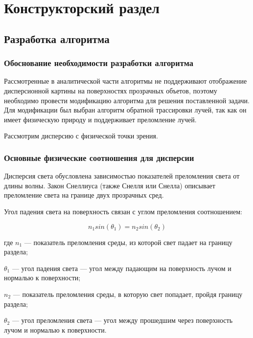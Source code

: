 \chapter{Конструкторский раздел}
\label{cha:design}

  \section{Разработка алгоритма}
  
    \subsection{Обоснование необходимости разработки алгоритма}
    
      Рассмотренные в аналитической части алгоритмы не поддерживают отображение дисперсионной картины на поверхностях прозрачных объетов, поэтому необходимо провести модификацию алгоритма для решения поставленной задачи. Для модификации был выбран алгоритм обратной трассировки лучей, так как он имеет физическую природу и поддерживает преломление лучей.

      Рассмотрим дисперсию с физической точки зрения.
    
    \subsection{Основные физические соотношения для дисперсии}
    
      Дисперсия света обусловлена зависимостью показателей преломления света от длины волны. Закон Снеллиуса (также Снелля или Снелла) описывает преломление света на границе двух прозрачных сред.

      Угол падения света на поверхность связан с углом преломления соотношением:

      \begin{equation}
         n_{1} sin(\theta_{1}) = n_{2} sin(\theta_{2}) 
      \end{equation}
      
      где $n_{1}$ — показатель преломления среды, из которой свет падает на границу раздела;
      
      $\theta_{1}$ — угол падения света — угол между падающим на поверхность лучом и нормалью к поверхности;
      
      $n_{2}$ — показатель преломления среды, в которую свет попадает, пройдя границу раздела;
      
      $\theta_{2}$ — угол преломления света — угол между прошедшим через поверхность лучом и нормалью к поверхности.
    
